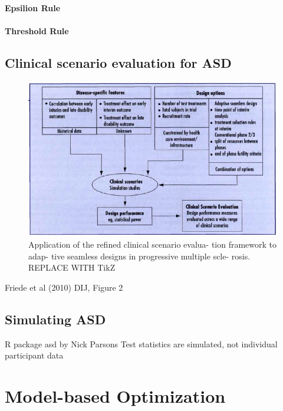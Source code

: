 \documentclass[bimj,fleqn]{w-art}
\theoremstyle{plain}
\theoremstyle{definition}
\begin{document}
\paragraph{Epsilion Rule}

\paragraph{Threshold Rule}

\subsection{Clinical scenario evaluation for ASD}
\label{ssec:clinical_scenario_evaluation_for_asd}

\begin{figure}[ht]
\centering
\includegraphics[width=\linewidth]{assets/friede_refinement_2010_fig2.png}
\caption{Application of the refined clinical scenario evalua- tion framework to adap- tive seamless designs in progressive multiple scle- rosis. REPLACE WITH TikZ}
\label{fig:friede_refinement_2010_fig2}
\end{figure}
Friede et al (2010) DIJ, Figure 2 %

\subsection{Simulating ASD}
\label{ssec:simulating_asd}
R package asd by Nick Parsons
Test statistics are simulated, not individual participant data

\section{Model-based Optimization}
\label{sec:model_based_optimization}
\end{document}
